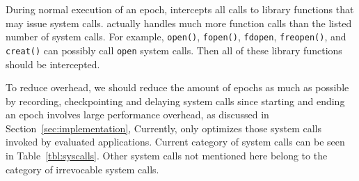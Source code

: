 \vspace*{\baselineskip} 
During normal execution of an epoch, \doubletake{} intercepts all calls to \pthreads{} 
library functions that may issue system calls. \doubletake{} actually handles much more function calls
than the listed number of system calls. For example, \texttt{open()}, \texttt{fopen()}, \texttt{fdopen}, \texttt{freopen()}, and \texttt{creat()} can possibly call \texttt{open} system calls. 
Then all of these library functions should be intercepted. 

To reduce overhead, we should reduce the amount of epochs as much as possible by 
recording, checkpointing and delaying system calls since starting and ending an epoch 
involves large performance overhead, as discussed in Section~\ref{sec:implementation}, 
Currently, \doubletake{} only optimizes those system calls invoked by evaluated applications.
Current category of system calls can be seen in Table~\ref{tbl:syscalls}. Other system calls
not mentioned here belong to the category of irrevocable system calls. 

\begin{comment}
To support multithreading programs, \DoubleTake{} has to record the order of synchronizations 
and replay them in the same order (Section~\ref{sec:multithreading}) and design memory allocator specially (Section~\ref{sec:mtheap}).

The basic idea of \DoubleTake{} is to greatly {\em reduce the number of checkings}:  
instead of checking a possible out-of-bounds error before every memory access, 
\DoubleTake{} checks all possible out-of-bounds errors of the whole program 
before those irrevocable system calls or in the end of an execution.
By checking buffer overflows accumulatively, \DoubleTake{} amortizes 
checking overhead over long executions and achieves much better performance. 
As showed in Figure~\ref{fig:diagram}, if a program does not have buffer overflows, 
it continues to perform those system calls and 
starts a new epoch after them by snapshotting state of this execution. 
If a program is found to have buffer overflows, \DoubleTake{} re-executes it by rolling back 
to last good state after installing hardware watchpoints on those overflowing addresses.
By handling exceptions, 
\DoubleTake{} can pinpoint precisely those memory accesses causing memory overflows without
actually instrumenting every access. 
\end{comment}


